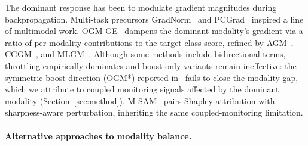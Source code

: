 \documentclass{article}
\begin{document}
The dominant response has been to modulate gradient magnitudes during backpropagation. Multi-task precursors GradNorm~\citep{chen2018gradnorm} and PCGrad~\citep{yu2020pcgrad} inspired a line of multimodal work. OGM-GE~\citep{peng2022ogmge} dampens the dominant modality's gradient via a ratio of per-modality contributions to the target-class score, refined by AGM~\citep{li2023agm}, CGGM~\citep{guo2024cggm}, and MLGM~\citep{kontras2024mlgm}. Although some methods include bidirectional terms, throttling empirically dominates and boost-only variants remain ineffective: the symmetric boost direction (OGM*) reported in~\citet{wei2024opm} fails to close the modality gap, which we attribute to coupled monitoring signals affected by the dominant modality (Section~\ref{sec:method}). M-SAM~\citep{nowdeh2025msam} pairs Shapley attribution with sharpness-aware perturbation, inheriting the same coupled-monitoring limitation.


\paragraph{Alternative approaches to modality balance.}
\end{document}
